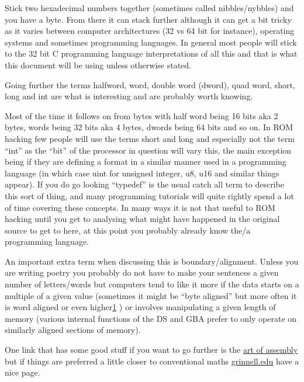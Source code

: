 \documentclass[
]{book}
\begin{document}
Stick two hexadecimal numbers together (sometimes called nibbles/nybbles) and you have a byte. From there it can stack further although it can get a bit tricky as it varies between computer architectures (32 vs 64 bit for instance), operating systems and sometimes programming languages. In general most people will stick to the 32 bit C programming language interpretations of all this and that is what this document will be using unless otherwise stated.

Going further the terms halfword, word, double word (dword), quad word, short, long and int are what is interesting and are probably worth knowing.

Most of the time it follows on from bytes with half word being 16 bits aka 2 bytes, words being 32 bits aka 4 bytes, dwords being 64 bits and so on. In ROM hacking few people will use the terms short and long and especially not the term ``int'' as the ``bit'' of the processor in question will vary this, the main exception being if they are defining a format in a similar manner used in a programming language (in which case uint for unsigned integer, u8, u16 and similar things appear). If you do go looking ``typedef'' is the usual catch all term to describe this sort of thing, and many programming tutorials will quite rightly spend a lot of time covering these concepts. In many ways it is not that useful to ROM hacking until you get to analysing what might have happened in the original source to get to here, at this point you probably already know the/a programming language.

An important extra term when discussing this is boundary/alignment. Unless you are writing poetry you probably do not have to make your sentences a given number of letters/words but computers tend to like it more if the data starts on a multiple of a given value (sometimes it might be ``byte aligned'' but more often it is word aligned or even higher\href{romhacking20202.html\#fn1x0}{1} ) or involves manipulating a given length of memory (various internal functions of the DS and GBA prefer to only operate on similarly aligned sections of memory).

One link that has some good stuff if you want to go further is the \href{http://www.plantation-productions.com/Webster/www.artofasm.com/Windows/HTML/DataRepresentation.html\#998834}{art of assembly} but if things are preferred a little closer to conventional maths \href{http://www.cs.grinnell.edu/~rebelsky/Courses/CS152/97F/Readings/student-binary.html}{grinnell.edu} have a nice page.
\end{document}
